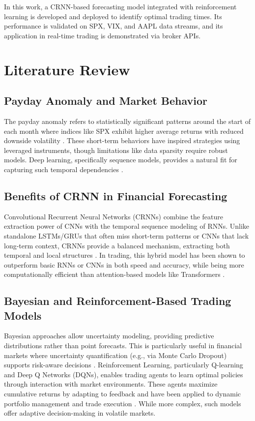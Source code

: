 \documentclass[conference]{IEEEtran}
\begin{document}
In this work, a CRNN-based forecasting model integrated with reinforcement learning is developed and deployed to identify optimal trading times. Its performance is validated on SPX, VIX, and AAPL data streams, and its application in real-time trading is demonstrated via broker APIs.


\section{Literature Review}

\subsection{Payday Anomaly and Market Behavior}
The payday anomaly refers to statistically significant patterns around the start of each month where indices like SPX exhibit higher average returns with reduced downside volatility \cite{quantpedia_payday}. These short-term behaviors have inspired strategies using leveraged instruments, though limitations like data sparsity require robust models. Deep learning, specifically sequence models, provides a natural fit for capturing such temporal dependencies \cite{deepvol2020}.

\subsection{Benefits of CRNN in Financial Forecasting}
Convolutional Recurrent Neural Networks (CRNNs) combine the feature extraction power of CNNs with the temporal sequence modeling of RNNs. Unlike standalone LSTMs/GRUs that often miss short-term patterns or CNNs that lack long-term context, CRNNs provide a balanced mechanism, extracting both temporal and local structures \cite{crnn_review}. In trading, this hybrid model has been shown to outperform basic RNNs or CNNs in both speed and accuracy, while being more computationally efficient than attention-based models like Transformers \cite{deepvol2020, tsang_crnn}.

\subsection{Bayesian and Reinforcement-Based Trading Models}
Bayesian approaches allow uncertainty modeling, providing predictive distributions rather than point forecasts. This is particularly useful in financial markets where uncertainty quantification (e.g., via Monte Carlo Dropout) supports risk-aware decisions \cite{blundell2015weight}. Reinforcement Learning, particularly Q-learning and Deep Q Networks (DQNs), enables trading agents to learn optimal policies through interaction with market environments. These agents maximize cumulative returns by adapting to feedback and have been applied to dynamic portfolio management and trade execution \cite{moody2001learning, deng2016deeptrader}. While more complex, such models offer adaptive decision-making in volatile markets.
\end{document}
